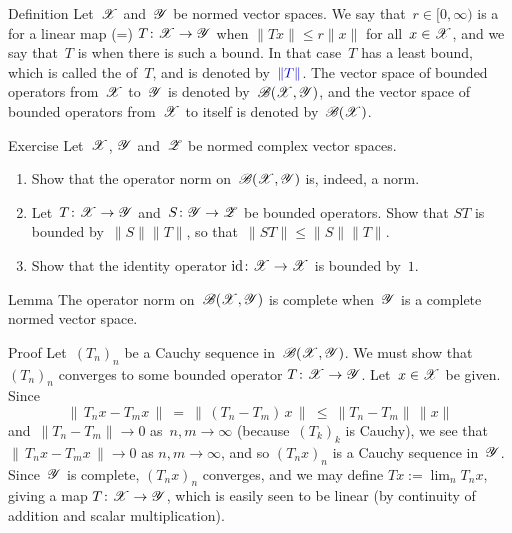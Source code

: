 \documentclass[a]{subfiles}
\begin{document}
\begin{parsec}[hilb]
\begin{point}{Definition}
Let~$\mathscr{X}$ and~$\mathscr{Y}$ be normed
vector spaces.
We say that~$r\in [0,\infty)$
is a  for a linear map (=) 
$T\colon \mathscr{X}\to\mathscr{Y}$
when  $\|Tx\|\leq r\|x\|$ for all~$x\in \mathscr{X}$,
and we say that~$T$ is 
when there is such a bound.
In that case~$T$ has a least bound,
which is called the  of~$T$,
and is denoted by~$\Define{\|T\|}$.
The vector space of bounded operators
from~$\mathscr{X}$ to~$\mathscr{Y}$
is denoted by~$\mathscr{B}(\mathscr{X},\mathscr{Y})$,
and the vector space of bounded operators
from~$\mathscr{X}$ to itself is denoted by~$\mathscr{B}(\mathscr{X})$.
\end{point}
\begin{point}{Exercise}%
Let~$\mathscr{X}$, $\mathscr{Y}$ and~$\mathscr{Z}$ be normed complex vector spaces.
\begin{enumerate}
\item
Show that the operator norm on~$\mathscr{B}(\mathscr{X},\mathscr{Y})$
is, indeed, a norm.
\item
Let~$T\colon \mathscr{X}\to \mathscr{Y}$ and~$S\colon \mathscr{Y}\to\mathscr{Z}$
be bounded operators.
Show that $ST$ is bounded by~$\|S\|\|T\|$,
so that~$\|ST\|\leq\|S\|\|T\|$.
\item
Show that the identity operator $\operatorname{id}\colon \mathscr{X}\to \mathscr{X}$
is bounded by~$1$.
\end{enumerate}
\end{point}
\begin{point}{Lemma}%
The operator norm on~$\mathscr{B}(\mathscr{X},\mathscr{Y})$ is complete
when~$\mathscr{Y}$ is a complete normed vector space.
\begin{point}{Proof}%
Let~$(T_n)_n$ be a Cauchy sequence in~$\mathscr{B}(\mathscr{X},\mathscr{Y})$.
We must show that~$(T_n)_n$ converges to some
bounded operator $T\colon \mathscr{X}\to\mathscr{Y}$.
Let~$x\in \mathscr{X}$ be given.
Since 
\begin{equation*}
\|\,T_nx - T_mx\,\|\ =\ \|\,(T_n-T_m)\,x\,\|\ \leq\  \|T_n-T_m\|\,\|x\|
\end{equation*}
and~$\|T_n-T_m\|\to 0$ as~$n,m\to \infty$ 
(because~$(T_k)_k$ is Cauchy),
we see that $\|\,T_nx-T_mx\,\|\to 0$ as $n,m\to \infty$,
and so $(T_nx)_n$ is a Cauchy sequence in~$\mathscr{Y}$.
Since~$\mathscr{Y}$ is complete,
 $(T_nx)_n$ converges,
and  we may define $Tx:=\lim_n T_nx$,
giving a map $T\colon \mathscr{X}\to \mathscr{Y}$,
which is easily seen to be linear
(by continuity of addition and scalar multiplication).


\end{point}
\end{point}
\end{parsec}
\end{document}
